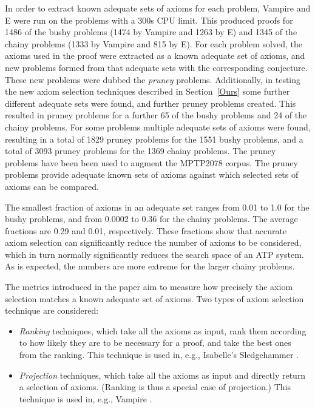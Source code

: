 \documentclass[EPiC]{easychair}
\begin{document}
In order to extract known adequate sets of axioms for each problem, Vampire
and E \cite{SCV19} were run on the problems with a 300s CPU limit.
This produced proofs for 1486 of the bushy problems (1474 by Vampire and 1263
by E) and 1345 of the chainy problems (1333 by Vampire and 815 by E).
For each problem solved, the axioms used in the proof were extracted as
a known adequate set of axioms, and new problems formed from that adequate
sets with the corresponding conjecture.
These new problems were dubbed the \emph{pruney} problems.
Additionally, in testing the new axiom selection techniques described in 
Section~\ref{Ours} some further different adequate sets were found, and 
further pruney problems created.
This resulted in pruney problems for a further 65 of the bushy problems and
24 of the chainy problems.
For some problems multiple adequate sets of axioms were found, resulting in
a total of 1829 pruney problems for the 1551 bushy problems, and a total of
3093 pruney problems for the 1369 chainy problems.
The pruney problems have been been used to augment the MPTP2078 corpus.
The pruney problems provide adequate known sets of axioms against which
selected sets of axioms can be compared.

The smallest fraction of axioms in an adequate set ranges from 0.01 to 1.0
for the bushy problems, and from 0.0002 to 0.36 for the chainy problems.
The average fractions are 0.29 and 0.01, respectively.
These fractions show that accurate axiom selection can significantly reduce the
number of axioms to be considered, which in turn normally significantly
reduces the search space of an ATP system.
As is expected, the numbers are more extreme for the larger chainy problems.

The metrics introduced in the paper aim to measure how precisely the
axiom selection matches a known adequate set of axioms.
Two types of axiom selection technique are considered:
\begin{itemize}
\item \emph{Ranking} techniques, which take all the axioms as input, rank them
      according to how likely they are to be necessary for a proof,
      and take the best ones from the ranking.
      This technique is used in, e.g., Isabelle's Sledgehammer \cite{PB10}.
\item \emph{Projection} techniques, which take all the axioms as input and
      directly return a selection of axioms.
      (Ranking is thus a special case of projection.)
      This technique is used in, e.g., Vampire \cite{HV11}.
\end{itemize}
\end{document}
